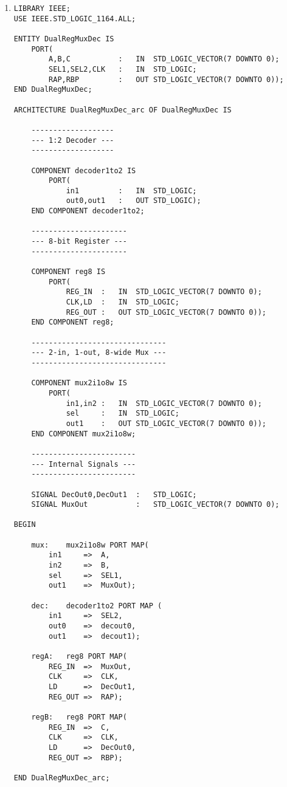 \begin{enumerate}
\begin{lstlisting}
	mux:	mux2i1o8w PORT MAP(
		in1		=>	B,
		in2		=>	C,
		sel		=>	SL2,
		out1	=>	MuxOut);
		
	regA:	reg8 PORT MAP(
		REG_IN	=>	A,
		CLK		=>	CLK,
		LD		=>	DecOut1,
		REG_OUT	=>	RAX);
		
	regB:	reg8 PORT MAP(
		REG_IN	=>	MuxOut,
		CLK		=>	CLK,
		LD		=>	DecOut0,
		REG_OUT	=>	RBX);
	
END DualRegDecMux_arc;
	\end{lstlisting}
	
	\item \begin{lstlisting}
LIBRARY IEEE;
USE IEEE.STD_LOGIC_1164.ALL;

ENTITY DualRegMuxDec IS
	PORT(
		A,B,C			:	IN	STD_LOGIC_VECTOR(7 DOWNTO 0);
		SEL1,SEL2,CLK	:	IN	STD_LOGIC;
		RAP,RBP			:	OUT	STD_LOGIC_VECTOR(7 DOWNTO 0));
END DualRegMuxDec;

ARCHITECTURE DualRegMuxDec_arc OF DualRegMuxDec IS
	
	-------------------
	--- 1:2 Decoder ---
	-------------------
	
	COMPONENT decoder1to2 IS
		PORT(
			in1			:	IN	STD_LOGIC;
			out0,out1	:	OUT	STD_LOGIC);
	END COMPONENT decoder1to2;
	
	----------------------
	--- 8-bit Register ---
	----------------------

	COMPONENT reg8 IS
		PORT(
			REG_IN	:	IN	STD_LOGIC_VECTOR(7 DOWNTO 0);
			CLK,LD	:	IN	STD_LOGIC;
			REG_OUT	:	OUT	STD_LOGIC_VECTOR(7 DOWNTO 0));
	END COMPONENT reg8;
	
	-------------------------------
	--- 2-in, 1-out, 8-wide Mux ---
	-------------------------------
	
	COMPONENT mux2i1o8w IS
		PORT(
			in1,in2	:	IN	STD_LOGIC_VECTOR(7 DOWNTO 0);
			sel		:	IN	STD_LOGIC;
			out1	:	OUT	STD_LOGIC_VECTOR(7 DOWNTO 0));
	END COMPONENT mux2i1o8w;
	
	------------------------
	--- Internal Signals ---
	------------------------
	
	SIGNAL DecOut0,DecOut1	:	STD_LOGIC;
	SIGNAL MuxOut			:	STD_LOGIC_VECTOR(7 DOWNTO 0);
	
BEGIN
	
	mux:	mux2i1o8w PORT MAP(
		in1		=>	A,
		in2		=>	B,
		sel		=>	SEL1,
		out1	=>	MuxOut);
		
	dec:	decoder1to2 PORT MAP (
		in1		=>	SEL2,
		out0	=>	decout0,
		out1	=>	decout1);
		
	regA:	reg8 PORT MAP(
		REG_IN	=>	MuxOut,
		CLK		=>	CLK,
		LD		=>	DecOut1,
		REG_OUT	=>	RAP);
		
	regB:	reg8 PORT MAP(
		REG_IN	=>	C,
		CLK		=>	CLK,
		LD		=>	DecOut0,
		REG_OUT	=>	RBP);
	
END DualRegMuxDec_arc;
	\end{lstlisting}
\end{enumerate}
\resumetocwriting